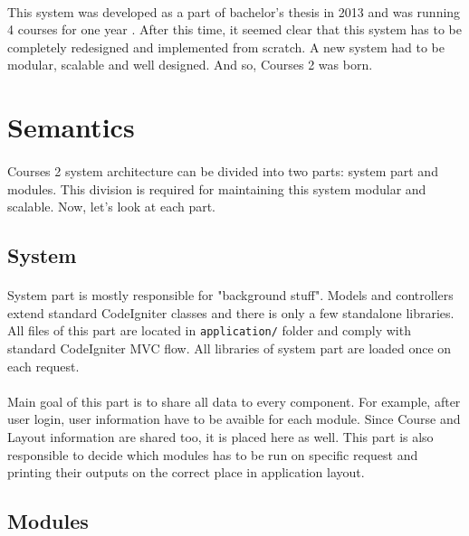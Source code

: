 \paragraph{}
This system was developed as a part of bachelor's thesis in 2013 \cite{culikbc} and was running 4 courses for one year \cite{culik}. After this time, it seemed clear that this system has to be completely redesigned and implemented from scratch. A new system had to be modular, scalable and well designed. And so, Courses 2 was born.

\section{Semantics}
\paragraph{}
Courses 2 system architecture can be divided into two parts: system part and modules. This division is required for maintaining this system modular and scalable. Now, let's look at each part.

\subsection{System}
\paragraph{}
System part is mostly responsible for "background stuff". Models and controllers extend standard CodeIgniter classes and there is only a few standalone libraries. All files of this part are located in \texttt{application/} folder and comply with standard CodeIgniter MVC flow. All libraries of system part are loaded once on each request.

\paragraph{}
Main goal of this part is to share all data to every component. For example, after user login, user information have to be avaible for each module. Since Course and Layout information are shared too, it is placed here as well. This part is also responsible to decide which modules has to be run on specific request and printing their outputs on the correct place in application layout.

\subsection{Modules}
